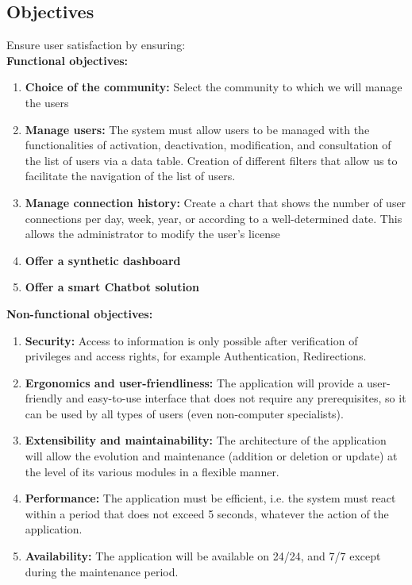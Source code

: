 \subsection{Objectives}
Ensure user satisfaction by ensuring:\\
\textbf{Functional objectives:}
\begin{enumerate}
\item \textbf{Choice of the community:}
Select the community to which we will manage the users

\item \textbf{Manage users:}
The system must allow users to be managed with the functionalities of activation,
deactivation, modification, and consultation of the list of users via a data table.
Creation of different filters that allow us to facilitate the navigation of the list of users.

\item \textbf{Manage connection history:}
Create a chart that shows the number of user connections per day, week, year, or
according to a well-determined date. This allows the administrator to modify the user’s license

\item \textbf{Offer a synthetic dashboard}
\item \textbf{Offer a smart Chatbot solution}

\end{enumerate}
\textbf{Non-functional objectives:}
\begin{enumerate}
\item\textbf{ Security:} Access to information is only possible after verification of privileges and access rights,
for example Authentication, Redirections.

\item \textbf{Ergonomics and user-friendliness:}
The application will provide a user-friendly and easy-to-use interface that does not
require any prerequisites, so it can be used by all types of users (even non-computer specialists).

\item \textbf{Extensibility and maintainability:}
The architecture of the application will allow the evolution and maintenance (addition
or deletion or update) at the level of its various modules in a flexible manner.

\item \textbf{Performance:}
The application must be efficient, i.e. the system must react within a period that does
not exceed 5 seconds, whatever the action of the application.
\item \textbf{Availability:}
The application will be available on 24/24, and 7/7 except during the maintenance period.

\end{enumerate}
